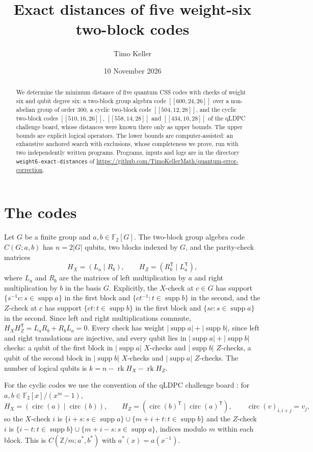 \documentclass[11pt]{amsart}
\title{Exact distances of five weight-six two-block codes}
\author{Timo Keller}
\date{10 November 2026}
\theoremstyle{definition}
\theoremstyle{remark}
\newcommand{\F}{\mathbb F_2}
\newcommand{\rk}{\operatorname{rk}}
\newcommand{\supp}{\operatorname{supp}}
\newcommand{\tp}{^{\mathsf T}}
\begin{document}
\begin{abstract}
We determine the minimum distance of five quantum CSS codes with checks of weight six and qubit degree six: a two-block group algebra code $[[600,24,26]]$ over a non-abelian group of order $300$, a cyclic two-block code $[[504,12,28]]$, and the cyclic two-block codes $[[510,16,26]]$, $[[558,14,28]]$ and $[[434,10,28]]$ of the qLDPC challenge board, whose distances were known there only as upper bounds. The upper bounds are explicit logical operators. The lower bounds are computer-assisted: an exhaustive anchored search with exclusions, whose completeness we prove, run with two independently written programs. Programs, inputs and logs are in the directory \texttt{weight6-exact-distances} of \url{https://github.com/TimoKellerMath/quantum-error-correction}.
\end{abstract}

\maketitle

\section{The codes}\label{sec:codes}

Let $G$ be a finite group and $a,b\in\F[G]$. The two-block group algebra code $C(G;a,b)$ \cite{WLP23,LP24} has $n=2|G|$ qubits, two blocks indexed by $G$, and the parity-check matrices
\[
H_X=(L_a\mid R_b),\qquad H_Z=(R_b\tp\mid L_a\tp),
\]
where $L_a$ and $R_b$ are the matrices of left multiplication by $a$ and right multiplication by $b$ in the basis $G$. Explicitly, the $X$-check at $c\in G$ has support $\{s^{-1}c:s\in\supp a\}$ in the first block and $\{ct^{-1}:t\in\supp b\}$ in the second, and the $Z$-check at $c$ has support $\{ct:t\in\supp b\}$ in the first block and $\{sc:s\in\supp a\}$ in the second. Since left and right multiplications commute, $H_XH_Z\tp=L_aR_b+R_bL_a=0$. Every check has weight $|\supp a|+|\supp b|$, since left and right translations are injective, and every qubit lies in $|\supp a|+|\supp b|$ checks: a qubit of the first block in $|\supp a|$ $X$-checks and $|\supp b|$ $Z$-checks, a qubit of the second block in $|\supp b|$ $X$-checks and $|\supp a|$ $Z$-checks. The number of logical qubits is $k=n-\rk H_X-\rk H_Z$.

For the cyclic codes we use the convention of the qLDPC challenge board \cite{Board}: for $a,b\in\F[x]/(x^m-1)$,
\[
H_X=(\operatorname{circ}(a)\mid\operatorname{circ}(b)),\qquad H_Z=(\operatorname{circ}(b)\tp\mid\operatorname{circ}(a)\tp),\qquad \operatorname{circ}(v)_{i,i+j}=v_j,
\]
so the $X$-check $i$ is $\{i+s:s\in\supp a\}\cup\{m+i+t:t\in\supp b\}$ and the $Z$-check $i$ is $\{i-t:t\in\supp b\}\cup\{m+i-s:s\in\supp a\}$, indices modulo $m$ within each block. This is $C(\mathbb Z/m;a^*,b^*)$ with $a^*(x)=a(x^{-1})$.
\end{document}
